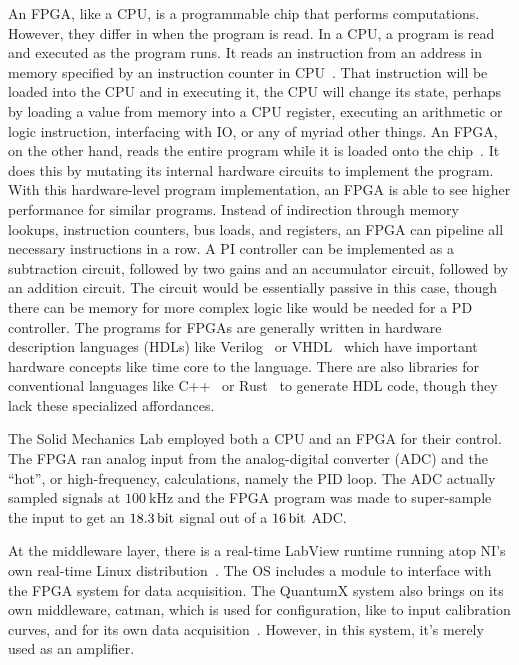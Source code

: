 \documentclass[english,12pt,a4paper,pdftex,eng,utf8]{aaltothesis}
\begin{document}
An FPGA, like a CPU, is a programmable chip that performs computations.  However, they differ in when the program is read.  In a CPU, a program is read and executed as the program runs.  It reads an instruction from an address in memory specified by an instruction counter in CPU~\cite{Malvino1999}.  That instruction will be loaded into the CPU and in executing it, the CPU will change its state, perhaps by loading a value from memory into a CPU register, executing an arithmetic or logic instruction, interfacing with IO, or any of myriad other things.  An FPGA, on the other hand, reads the entire program while it is loaded onto the chip~\cite{MeyerBaese2014a,Kaur2009}.  It does this by mutating its internal hardware circuits to implement the program.  With this hardware-level program implementation, an FPGA is able to see higher performance for similar programs.  Instead of indirection through memory lookups, instruction counters, bus loads, and registers, an FPGA can pipeline all necessary instructions in a row.  A PI controller can be implemented as a subtraction circuit, followed by two gains and an accumulator circuit, followed by an addition circuit.  The circuit would be essentially passive in this case, though there can be memory for more complex logic like would be needed for a PD controller.  The programs for FPGAs are generally written in hardware description languages (HDLs) like Verilog~\cite{IEEE1800-2023} or VHDL~\cite{IEEE1070-2000} which have important hardware concepts like time core to the language.  There are also libraries for conventional languages like C++~\cite{VivadoHLS} or Rust~\cite{RustHDL} to generate HDL code, though they lack these specialized affordances.

The Solid Mechanics Lab employed both a CPU and an FPGA for their control.  The FPGA ran  analog input from the analog-digital converter (ADC) and the ``hot'', or high-frequency, calculations, namely the PID loop.  The ADC actually sampled signals at $\qty{100}{\kilo\hertz}$ and the FPGA program was made to super-sample the input to get an $\qty{18.3}{\bit}$ signal out of a $\qty{16}{\bit}$ ADC.\

At the middleware layer, there is a real-time LabView runtime running atop NI's own real-time Linux distribution~\cite{NICompactRIO}.  The OS includes a module to interface with the FPGA system for data acquisition.  The QuantumX system also brings on its own middleware, catman, which is used for configuration, like to input calibration curves, and for its own data acquisition~\cite{HBKcatman}.  However, in this system, it's merely used as an amplifier.
\end{document}
